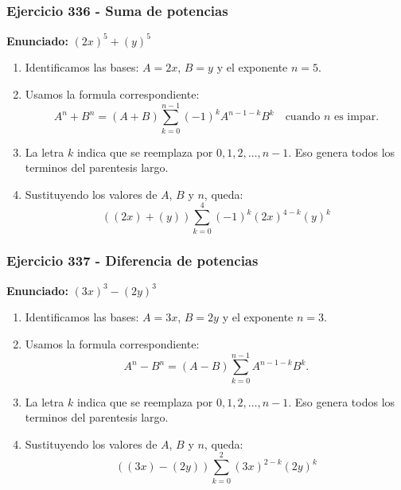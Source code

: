\documentclass[11pt,a4paper]{article}
\begin{document}
\subsubsection*{Ejercicio 336 - Suma de potencias}
\textbf{Enunciado:} $ \left(2 x\right)^{5}+\left(y\right)^{5} $\par
\begin{enumerate}[leftmargin=2em]
\item Identificamos las bases: \(A=2 x\), \(B=y\) y el exponente \(n=5\).
\item Usamos la formula correspondiente: \[A^n+B^n=(A+B)\sum_{k=0}^{n-1}(-1)^kA^{n-1-k}B^k\quad\text{cuando }n\text{ es impar}.\]
\item La letra \(k\) indica que se reemplaza por \(0,1,2,\ldots,n-1\). Eso genera todos los terminos del parentesis largo.
\item Sustituyendo los valores de \(A\), \(B\) y \(n\), queda: \[\boxed{\left(\left(2 x\right)+\left(y\right)\right)\sum_{k=0}^{4}(-1)^k\left(2 x\right)^{4-k}\left(y\right)^k}\]
\end{enumerate}

\vspace{0.2cm}
\subsubsection*{Ejercicio 337 - Diferencia de potencias}
\textbf{Enunciado:} $ \left(3 x\right)^{3}-\left(2 y\right)^{3} $\par
\begin{enumerate}[leftmargin=2em]
\item Identificamos las bases: \(A=3 x\), \(B=2 y\) y el exponente \(n=3\).
\item Usamos la formula correspondiente: \[A^n-B^n=(A-B)\sum_{k=0}^{n-1}A^{n-1-k}B^k.\]
\item La letra \(k\) indica que se reemplaza por \(0,1,2,\ldots,n-1\). Eso genera todos los terminos del parentesis largo.
\item Sustituyendo los valores de \(A\), \(B\) y \(n\), queda: \[\boxed{\left(\left(3 x\right)-\left(2 y\right)\right)\sum_{k=0}^{2}\left(3 x\right)^{2-k}\left(2 y\right)^k}\]
\end{enumerate}

\vspace{0.2cm}
\end{document}
